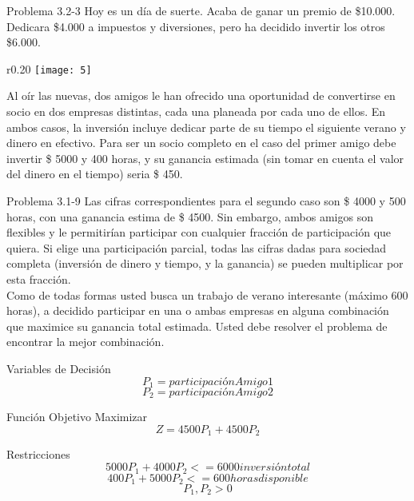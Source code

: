 \documentclass{beamer}
\begin{document}
\begin{frame}[t,fragile]{Problema 3.2-3}
Hoy es un día de suerte. Acaba de ganar un premio de \$10.000. Dedicara \$4.000 a impuestos y diversiones, pero ha decidido invertir los otros \$6.000. \begin{wrapfigure}{r}{0.20\textwidth}
    \centering
    \texttt{[image: 5]}
\end{wrapfigure}Al oír las nuevas, dos amigos le han ofrecido una oportunidad de convertirse en socio en dos empresas distintas, cada una planeada por cada uno de ellos. En ambos casos, la inversión incluye dedicar parte de su tiempo el siguiente verano y dinero en efectivo. Para ser un socio completo en el caso del primer amigo debe invertir \$ 5000 y 400 horas, y su ganancia estimada (sin tomar en cuenta el valor del dinero en el tiempo) seria \$ 450. 

\end{frame}
\begin{frame}[t,fragile]{Problema  3.1-9}
Las cifras correspondientes para el segundo caso son \$ 4000 y 500 horas, con una ganancia estima de \$ 4500. Sin embargo, ambos amigos son flexibles y le permitirían participar con cualquier fracción de participación que quiera. Si elige una participación parcial, todas las cifras dadas para sociedad completa (inversión de dinero y tiempo, y la ganancia) se pueden multiplicar por esta fracción. \\
Como de todas formas usted busca un trabajo de verano interesante (máximo 600 horas), a decidido participar en una o ambas empresas en alguna combinación que maximice su ganancia total estimada. Usted debe resolver el problema de encontrar la mejor combinación.
\end{frame}

\begin{frame}[fragile]{Variables de Decisión}
\[P_{1} = participación Amigo 1\]
\[P_{2} = participación Amigo 2\]

\end{frame}

\begin{frame}[fragile]{Función Objetivo}
Maximizar\\
\[Z = 4500P_{1} + 4500P_{2}\]

\end{frame}

\begin{frame}[fragile]{Restricciones}
\[5000P_{1} + 4000P_{2} <= 6000 inversión total\]
\[400P_{1} + 5000P_{2} <= 600 horas disponible\]
\[P_{1}, P_{2} > 0\]

\end{frame}
\end{document}
